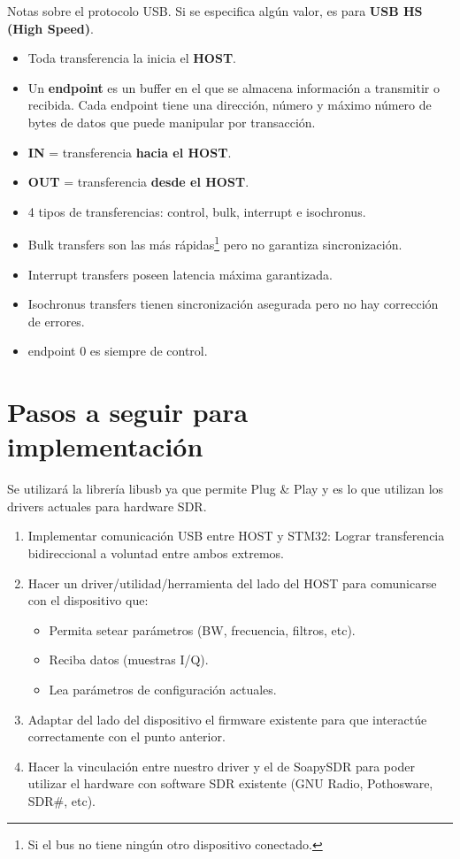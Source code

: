 \documentclass[a4paper,12pt]{report} %
\begin{document}
Notas sobre el protocolo USB. Si se especifica algún valor, es para \textbf{USB HS (High Speed)}.
\begin{itemize}
	\item Toda transferencia la inicia el \textbf{HOST}.
	\item Un \textbf{endpoint} es un buffer en el que se almacena información a transmitir o recibida. Cada endpoint tiene una dirección, número y máximo número de bytes de datos que puede manipular por transacción.
	\item \textbf{IN} = transferencia \textbf{hacia el HOST}.
	\item \textbf{OUT} = transferencia \textbf{desde el HOST}.
	\item 4 tipos de transferencias: control, bulk, interrupt e isochronus.
	\item Bulk transfers son las más rápidas\footnote{Si el bus no tiene ningún otro dispositivo conectado.} pero no garantiza sincronización.
	\item Interrupt transfers poseen latencia máxima garantizada.
	\item Isochronus transfers tienen sincronización asegurada pero no hay corrección de errores.
	\item endpoint 0 es siempre de control.
\end{itemize}

\section{Pasos a seguir para implementación}

Se utilizará la librería libusb ya que permite Plug \& Play y es lo que utilizan los drivers actuales para hardware SDR.
\begin{enumerate}
	\item Implementar comunicación USB entre HOST y STM32: Lograr transferencia bidireccional a voluntad entre ambos extremos.
	\item Hacer un driver/utilidad/herramienta del lado del HOST para comunicarse con el dispositivo que:
	\begin{itemize}
		\item Permita setear parámetros (BW, frecuencia, filtros, etc).
		\item Reciba datos (muestras I/Q).
		\item Lea parámetros de configuración actuales.
	\end{itemize}
	\item Adaptar del lado del dispositivo el firmware existente para que interactúe correctamente con el punto anterior.
	\item Hacer la vinculación entre nuestro driver y el de SoapySDR para poder utilizar el hardware con software SDR existente (GNU Radio, Pothosware, SDR\#, etc).
\end{enumerate}
\end{document}
